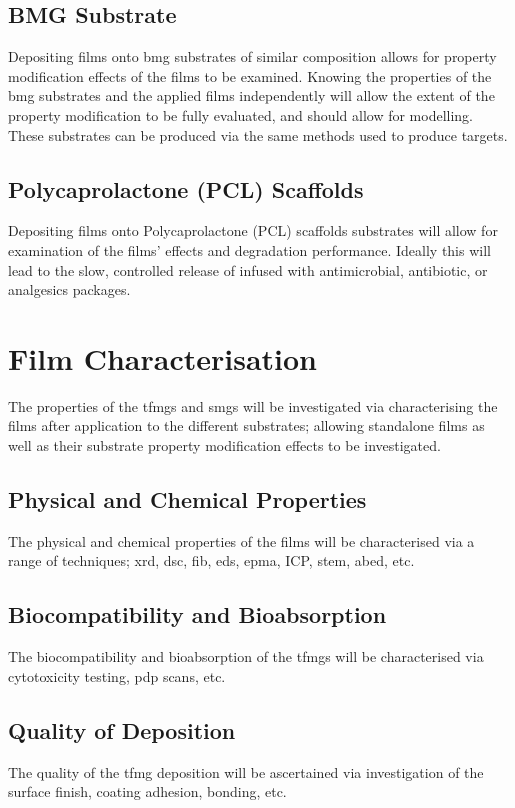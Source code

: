 \documentclass[a4paper,12pt,oneside]{report}%
\begin{document}
\subsection{BMG Substrate}
Depositing films onto \gls{bmg} substrates of similar composition allows for property modification effects of the films to be examined. Knowing the properties of the \gls{bmg} substrates and the applied films independently will allow the extent of the property modification to be fully evaluated, and should allow for modelling. These substrates can be produced via the same methods used to produce targets. 

\subsection{Polycaprolactone (PCL) Scaffolds}
Depositing films onto Polycaprolactone (PCL) scaffolds substrates will allow for examination of the films' effects and degradation performance. Ideally this will lead to the slow, controlled release of infused with antimicrobial, antibiotic, or analgesics packages.

\section{Film Characterisation}
The properties of the \glspl{tfmg} and \glspl{smg} will be investigated via characterising the films after application to the different substrates; allowing standalone films as well as their substrate property modification effects to be investigated. 

\subsection{Physical and Chemical Properties}
The physical and chemical properties of the films will be characterised via a range of techniques; \acrshort{xrd}, \acrshort{dsc}, \acrshort{fib}, \acrshort{eds}, \acrshort{epma}, ICP, \acrshort{stem}, \acrshort{abed}, etc. 

\subsection{Biocompatibility and Bioabsorption} 
The biocompatibility and bioabsorption of the \glspl{tfmg} will be characterised via cytotoxicity testing, \acrshort{pdp} scans, etc. 

\subsection{Quality of Deposition} 
The quality of the \gls{tfmg} deposition will be ascertained via investigation of the surface finish, coating adhesion, bonding, etc.
\end{document}
